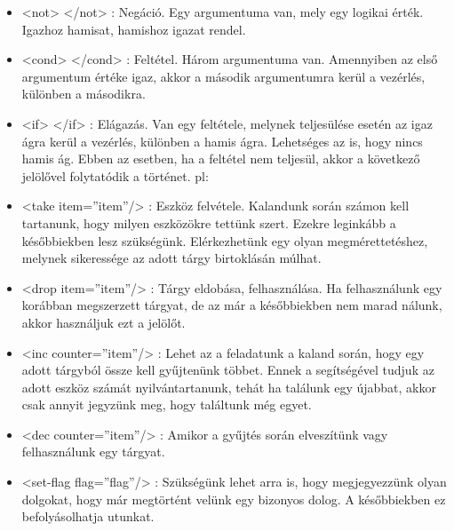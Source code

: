 \documentclass[12pt,a4paper,oneside]{report}
\begin{document}
\begin{itemize}
      \item <{\color{Tag}not}> <{\color{Tag}/not}> : Negáció. Egy
        argumentuma van, mely egy logikai érték. Igazhoz hamisat,
        hamishoz igazat rendel.
    
      \item <{\color{Tag}cond}> <{\color{Tag}/cond}> : Feltétel. Három
        argumentuma van. Amennyiben az első argumentum értéke igaz,
        akkor a második argumentumra kerül a vezérlés, különben a
        másodikra.
    
      \item <{\color{Tag}if}> <{\color{Tag}/if}> : Elágazás. Van egy
        feltétele, melynek teljesülése esetén az igaz ágra kerül a
        vezérlés, különben a hamis ágra. Lehetséges az is, hogy nincs
        hamis ág. Ebben az esetben, ha a feltétel nem teljesül, akkor
        a következő jelölővel folytatódik a történet.  pl:
    
      \item <{\color{Tag}take}
        {\color{Attr}item}={\color{Value}''item''}/> : Eszköz
        felvétele. Kalandunk során számon kell tartanunk, hogy milyen
        eszközökre tettünk szert. Ezekre leginkább a későbbiekben lesz
        szükségünk. Elérkezhetünk egy olyan megmérettetéshez, melynek
        sikeressége az adott tárgy birtoklásán múlhat.
    
      \item <{\color{Tag}drop}
        {\color{Attr}item}={\color{Value}''item''}/> : Tárgy eldobása,
        felhasználása. Ha felhasználunk egy korábban megszerzett
        tárgyat, de az már a későbbiekben nem marad nálunk, akkor
        használjuk ezt a jelölőt.
    
      \item <{\color{Tag}inc}
        {\color{Attr}counter}={\color{Value}''item''}/> : Lehet az a
        feladatunk a kaland során, hogy egy adott tárgyból össze kell
        gyűjtenünk többet. Ennek a segítségével tudjuk az adott eszköz
        számát nyilvántartanunk, tehát ha találunk egy újabbat, akkor
        csak annyit jegyzünk meg, hogy találtunk még egyet.
    
      \item <{\color{Tag}dec}
        {\color{Attr}counter}={\color{Value}''item''}/> : Amikor a
        gyűjtés során elveszítünk vagy felhasználunk egy tárgyat.
    
      \item <{\color{Tag}set-flag}
        {\color{Attr}flag}={\color{Value}''flag''}/> : Szükségünk lehet
        arra is, hogy megjegyezzünk olyan dolgokat, hogy már
        megtörtént velünk egy bizonyos dolog. A későbbiekben ez
        befolyásolhatja utunkat.
    

\end{itemize}
\end{document}
